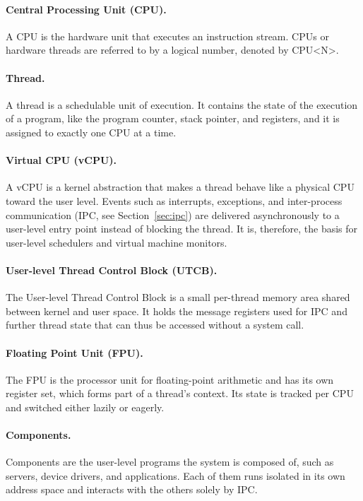 \paragraph{Central Processing Unit (CPU).}
A CPU is the hardware unit that executes an instruction stream.
CPUs or hardware threads are referred to by a logical number, denoted by CPU<N>.

\paragraph{Thread.}
A thread is a schedulable unit of execution.
It contains the state of the execution of a program, like the program counter, stack pointer, and registers, and it is assigned to exactly one CPU at a time.

\paragraph{Virtual CPU (vCPU).}
A vCPU is a kernel abstraction that makes a thread behave like a physical CPU toward the user level.
Events such as interrupts, exceptions, and inter-process communication (IPC, see Section~\ref{sec:ipc}) are delivered asynchronously to a user-level entry point instead of blocking the thread.
It is, therefore, the basis for user-level schedulers and virtual machine monitors.

\paragraph{User-level Thread Control Block (UTCB).}
The User-level Thread Control Block is a small per-thread memory area shared between kernel and user space.
It holds the message registers used for IPC and further thread state that can thus be accessed without a system call.

\paragraph{Floating Point Unit (FPU).}
The FPU is the processor unit for floating-point arithmetic and has its own register set, which forms part of a thread's context. Its state is tracked per CPU and switched either lazily or eagerly.

\paragraph{Components.}
Components are the user-level programs the system is composed of, such as servers, device drivers, and applications.
Each of them runs isolated in its own address space and interacts with the others solely by IPC.

